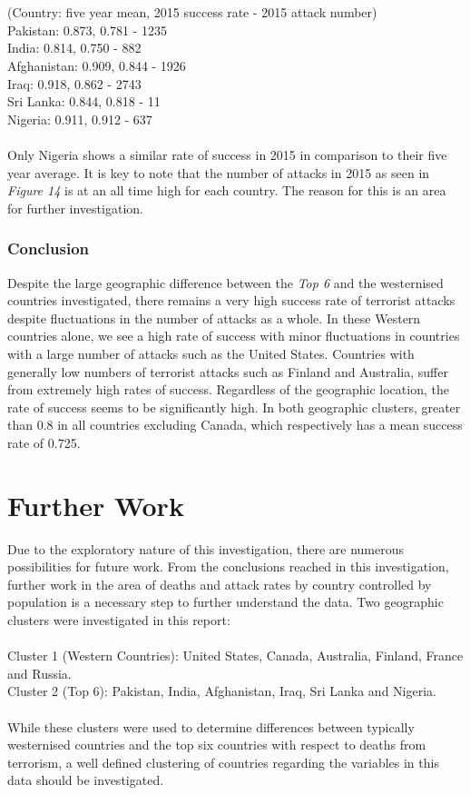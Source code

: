 \documentclass[10pt,a4paper]{article}
\begin{document}
\\\\
\indent \indent(Country: five year mean, 2015 success rate - 2015 attack number) \\
\indent Pakistan: 0.873,  0.781 - 1235  \\
\indent India: 0.814, 0.750 - 882 \\
\indent Afghanistan: 0.909, 0.844 - 1926 \\
\indent Iraq: 0.918, 0.862 - 2743 \\
\indent Sri Lanka: 0.844, 0.818 - 11 \\
\indent Nigeria: 0.911, 0.912 - 637 \\
\\
Only Nigeria shows a similar rate of success in 2015 in comparison to their five year average. It is key to note that the number of attacks in 2015 as seen in \textit{Figure 14} is at an all time high for each country. The reason for this is an area for further investigation.

\subsubsection{Conclusion}
Despite the large geographic difference between the \textit{Top 6} and the westernised countries investigated, there remains a very high success rate of terrorist attacks despite fluctuations in the number of attacks as a whole.
In these Western countries alone, we see a high rate of success with minor fluctuations in countries with a large number of attacks such as the United States.
Countries with generally low numbers of terrorist attacks such as Finland and Australia, suffer from extremely high rates of success.
Regardless of the geographic location, the rate of success seems to be significantly high. In both geographic clusters, greater than 0.8 in all countries excluding Canada, which respectively has a mean success rate of 0.725.


\section{Further Work} 
Due to the exploratory nature of this investigation, there are numerous possibilities for future work.
From the conclusions reached in this investigation, further work in the area of deaths and attack rates by country controlled by population is a necessary step to further understand the data.
Two geographic clusters were investigated in this report:
\\\\
\indent Cluster 1 (Western Countries): United States, Canada, Australia, Finland, France and Russia. \\
\indent Cluster 2 (Top 6): Pakistan, India, Afghanistan, Iraq, Sri Lanka and Nigeria.
\\\\
While these clusters were used to determine differences between typically westernised countries and the top six countries with respect to deaths from terrorism, a well defined clustering of countries regarding the variables in this data should be investigated.
\end{document}
